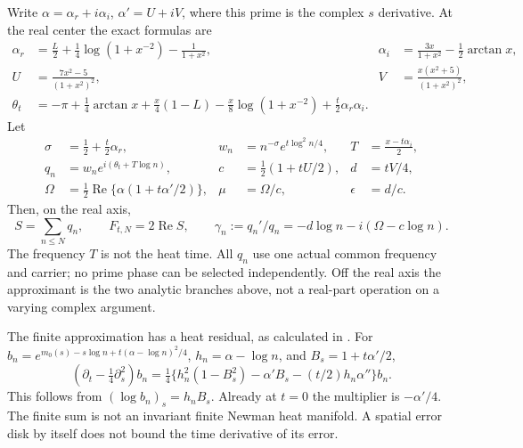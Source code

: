 \documentclass[11pt]{article}
\numberwithin{equation}{section}
\theoremstyle{definition}
\theoremstyle{remark}
\DeclareMathOperator{\Rea}{Re}
\begin{document}
Write $\alpha=\alpha_r+i\alpha_i$, $\alpha'=U+iV$, where this prime
is the complex $s$ derivative. At the real center the exact formulas are
\begin{align}
 \alpha_r&=\frac L2+\frac14\log(1+x^{-2})-\frac1{1+x^2},&
 \alpha_i&=\frac{3x}{1+x^2}-\frac12\arctan x,\nonumber\\
 U&=\frac{7x^2-5}{(1+x^2)^2},&
 V&=\frac{x(x^2+5)}{(1+x^2)^2},\label{eq:real-data}\\
 \theta_t&=-\pi+\frac14\arctan x+\frac x4(1-L)
          -\frac x8\log(1+x^{-2})+\frac t2\alpha_r\alpha_i.\nonumber
\end{align}
Let
\begin{align}
 \sigma&=\frac12+\frac t2\alpha_r,&
 w_n&=n^{-\sigma}e^{t\log^2n/4},& T&=\frac{x-t\alpha_i}{2},\nonumber\\
 q_n&=w_ne^{i(\theta_t+T\log n)},&
 c&=\frac12(1+tU/2),& d&=tV/4,\label{eq:qdata}\\
 \Omega&=\frac12\Rea\{\alpha(1+t\alpha'/2)\},&
 \mu&=\Omega/c,&\epsilon&=d/c.\nonumber
\end{align}
Then, on the real axis,
\begin{equation}
 S=\sum_{n\le N}q_n,\qquad F_{t,N}=2\Rea S,\qquad
 \gamma_n:=q_n'/q_n=-d\log n-i(\Omega-c\log n).
 \label{eq:physical-derivative}
\end{equation}
The frequency $T$ is not the heat time. All $q_n$ use one actual common
frequency and carrier; no prime phase can be selected independently.
Off the real axis the approximant is the two analytic branches above,
not a real-part operation on a varying complex argument.

The finite approximation has a heat residual, as calculated in
\cite{torus}. For $b_n=e^{m_0(s)-s\log n+t(\alpha-\log n)^2/4}$,
$h_n=\alpha-\log n$, and $B_s=1+t\alpha'/2$,
\begin{equation}
 (\partial_t-\tfrac14\partial_s^2)b_n
 =\tfrac14\{h_n^2(1-B_s^2)-\alpha'B_s-(t/2)h_n\alpha''\}b_n.
 \label{eq:finite-residual}
\end{equation}
This follows from $(\log b_n)_s=h_nB_s$. Already at $t=0$ the
multiplier is $-\alpha'/4$. The finite sum is not an invariant finite
Newman heat manifold. A spatial error disk by itself does not bound
the time derivative of its error.
\end{document}

